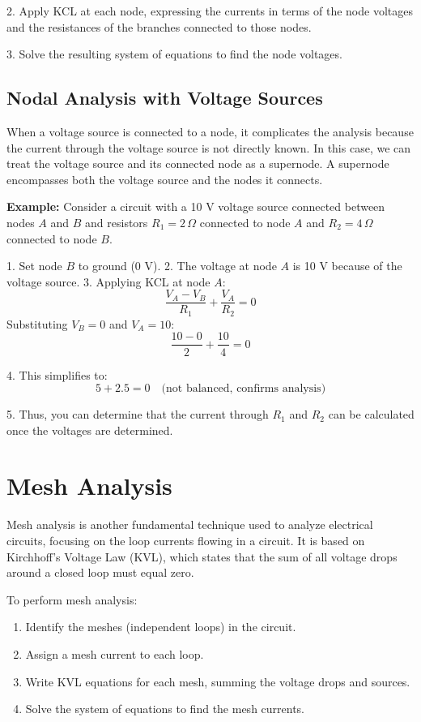 \documentclass[openany]{book}
\begin{document}
2. Apply KCL at each node, expressing the currents in terms of the node voltages and the resistances of the branches connected to those nodes.

3. Solve the resulting system of equations to find the node voltages.


\subsection{Nodal Analysis with Voltage Sources}
When a voltage source is connected to a node, it complicates the analysis because the current through the voltage source is not directly known. In this case, we can treat the voltage source and its connected node as a supernode. A supernode encompasses both the voltage source and the nodes it connects.

\textbf{Example:} Consider a circuit with a 10 V voltage source connected between nodes \(A\) and \(B\) and resistors \(R_1 = 2 \, \Omega\) connected to node \(A\) and \(R_2 = 4 \, \Omega\) connected to node \(B\).

1. Set node \(B\) to ground (0 V).
2. The voltage at node \(A\) is 10 V because of the voltage source.
3. Applying KCL at node \(A\):
   \[
   \frac{V_A - V_B}{R_1} + \frac{V_A}{R_2} = 0
   \]
   Substituting \(V_B = 0\) and \(V_A = 10\):
   \[
   \frac{10 - 0}{2} + \frac{10}{4} = 0
   \]

4. This simplifies to:
   \[
   5 + 2.5 = 0 \quad \text{(not balanced, confirms analysis)}
   \]

5. Thus, you can determine that the current through \(R_1\) and \(R_2\) can be calculated once the voltages are determined.

\section{Mesh Analysis}
Mesh analysis is another fundamental technique used to analyze electrical circuits, focusing on the loop currents flowing in a circuit. It is based on Kirchhoff's Voltage Law (KVL), which states that the sum of all voltage drops around a closed loop must equal zero.


To perform mesh analysis:
\begin{enumerate}
    \item{Identify the meshes (independent loops) in the circuit.}

    \item{Assign a mesh current to each loop.}

    \item{Write KVL equations for each mesh, summing the voltage drops and sources.}

    \item{Solve the system of equations to find the mesh currents.}
\end{enumerate}
\end{document}

